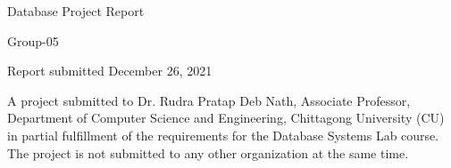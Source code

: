 \begin{titlepage}
\begin{center}
    {\large
      Database Project Report %
    }\\
    \vspace{0.2cm}
    {\Large
      Group-05 %
      
    }
  \end{center}
  \vfill
  
  \begin{center}
  Report submitted December 26, 2021
  \end{center}
	\vfill
A project submitted to Dr. Rudra Pratap Deb Nath, Associate Professor, Department of Computer Science and Engineering, Chittagong University (CU) in partial fulfillment of the requirements for the Database Systems Lab course. The project is not submitted to any other organization at the same time. 

\end{titlepage}
\clearpage
